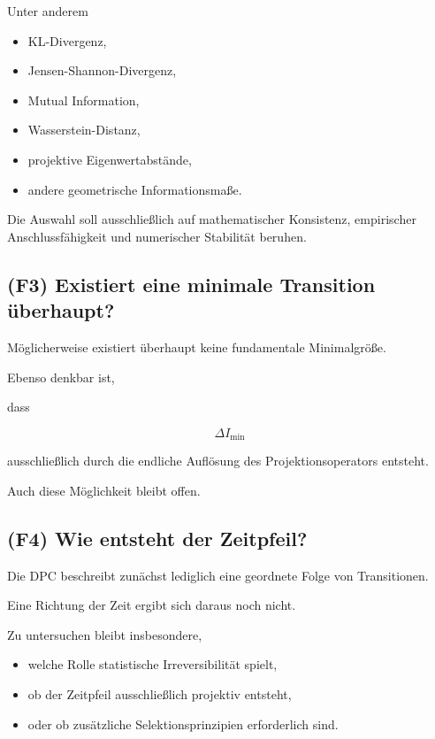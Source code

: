 \documentclass[11pt,a4paper]{article}
\begin{document}
Unter anderem

\begin{itemize}

\item KL-Divergenz,

\item Jensen-Shannon-Divergenz,

\item Mutual Information,

\item Wasserstein-Distanz,

\item projektive Eigenwertabstände,

\item andere geometrische Informationsmaße.

\end{itemize}

Die Auswahl soll ausschließlich
auf mathematischer Konsistenz,
empirischer Anschlussfähigkeit
und numerischer Stabilität beruhen.


\subsection*{(F3) Existiert eine minimale Transition überhaupt?}

Möglicherweise existiert überhaupt keine
fundamentale Minimalgröße.

Ebenso denkbar ist,

dass

\[
\Delta I_{\min}
\]

ausschließlich durch die endliche
Auflösung des Projektionsoperators entsteht.

Auch diese Möglichkeit bleibt offen.


\subsection*{(F4) Wie entsteht der Zeitpfeil?}

Die DPC beschreibt zunächst lediglich
eine geordnete Folge von Transitionen.

Eine Richtung der Zeit
ergibt sich daraus noch nicht.

Zu untersuchen bleibt insbesondere,

\begin{itemize}

\item welche Rolle statistische Irreversibilität spielt,

\item ob der Zeitpfeil ausschließlich projektiv entsteht,

\item oder ob zusätzliche Selektionsprinzipien erforderlich
sind.

\end{itemize}
\end{document}
